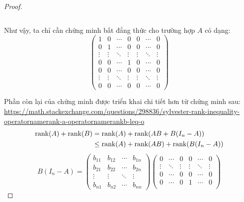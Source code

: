 \documentclass[class=nhvh-linear-algebra,crop=false]{standalone}
\begin{document}
\begin{proof}
\begin{itemize}
\[              \]
    \end{itemize}
    \par Như vậy, ta chỉ cần chứng minh bất đẳng thức cho trường hợp $A$ có dạng:
    \[
        \begin{pmatrix}
            1      & 0      & \cdots & 0      & 0      & \cdots & 0      \\
            0      & 1      & \cdots & 0      & 0      & \cdots & 0      \\
            \vdots & \vdots & \ddots & \vdots & \vdots & \ddots & \vdots \\
            0      & 0      & \cdots & 1      & 0      & \cdots & 0      \\
            0      & 0      & \cdots & 0      & 0      & \cdots & 0      \\
            \vdots & \vdots & \ddots & \vdots & \vdots & \ddots & \vdots \\
            0      & 0      & \cdots & 0      & 0      & \cdots & 0
        \end{pmatrix}
    \]
    \par Phần còn lại của chứng minh được triển khai chi tiết hơn từ chứng minh sau: \url{https://math.stackexchange.com/questions/298836/sylvester-rank-inequality-operatornamerank-a-operatornamerankb-leq-o}
    \begin{align*}
        \text{rank}(A) + \text{rank}(B) & = \text{rank}(A) + \text{rank}(AB + B(I_{n} - A))          \\
                            & \le \text{rank}(A) + \text{rank}(AB) + \text{rank}(B(I_{n} - A))
    \end{align*}
    \[
        B(I_{n} - A) =
        \begin{pmatrix}
            b_{11} & b_{12} & \cdots & b_{1n} \\
            b_{21} & b_{22} & \cdots & b_{2n} \\
            \vdots & \vdots & \ddots & \vdots \\
            b_{n1} & b_{n2} & \cdots & b_{nn}
        \end{pmatrix}
        \begin{pmatrix}
            0      & \cdots & 0      & 0      & \cdots & 0      \\
            \vdots & \ddots & \vdots & \vdots & \ddots & \vdots \\
            0      & \cdots & 0      & 0      & \cdots & 0      \\
            0      & \cdots & 0      & 1      & \cdots & 0      \\

\end{pmatrix}\]
\end{proof}
\end{document}
